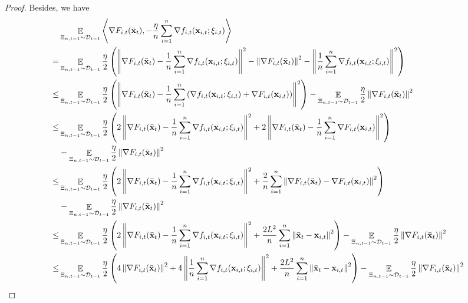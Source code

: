 \documentclass{article}
\begin{document}
\begin{proof}
Besides, we have
\begin{align}
\nonumber
& \EE_{ \Xi_{n,t-1} \sim \Dcal_{t-1} } \lrangle{\nabla F_{i,t}(\bar{\x}_t), -\frac{\eta}{n}\sum_{i=1}^n \nabla f_{i,t}(\x_{i,t};\xi_{i,t})} \\ \nonumber
= & \EE_{ \Xi_{n,t-1} \sim \Dcal_{t-1} } \frac{\eta}{2}\lrincir{ \lrnorm{\nabla F_{i,t}(\bar{\x}_t) -\frac{1}{n}\sum_{i=1}^n \nabla f_{i,t}(\x_{i,t};\xi_{i,t})}^2 - \lrnorm{\nabla F_{i,t}(\bar{\x}_t)}^2 - \lrnorm{\frac{1}{n}\sum_{i=1}^n \nabla f_{i,t}(\x_{i,t};\xi_{i,t})}^2 } \\ \nonumber
\le & \EE_{ \Xi_{n,t-1} \sim \Dcal_{t-1} } \frac{\eta}{2}\lrincir{ \lrnorm{\nabla F_{i,t}(\bar{\x}_t) -\frac{1}{n}\sum_{i=1}^n \lrincir{  \nabla  f_{i,t}(\x_{i,t};\xi_{i,t}) +   \nabla F_{i,t}(\x_{i,t}) } }^2 }  - \EE_{ \Xi_{n,t-1} \sim \Dcal_{t-1} } \frac{\eta}{2} \lrnorm{\nabla F_{i,t}(\bar{\x}_t)}^2  \\ \nonumber
\le & \EE_{ \Xi_{n,t-1} \sim \Dcal_{t-1} } \frac{\eta}{2}\lrincir{ 2 \lrnorm{\nabla F_{i,t}(\bar{\x}_t) -\frac{1}{n}\sum_{i=1}^n \nabla  f_{i,t}(\x_{i,t};\xi_{i,t})}^2 + 2 \lrnorm{ \nabla F_{i,t}(\bar{\x}_t) - \frac{1}{n}\sum_{i=1}^n\nabla F_{i,t}(\x_{i,t}) }^2 } \\ \nonumber 
& - \EE_{ \Xi_{n,t-1} \sim \Dcal_{t-1} } \frac{\eta}{2} \lrnorm{\nabla F_{i,t}(\bar{\x}_t)}^2  \\ \nonumber
\le & \EE_{ \Xi_{n,t-1} \sim \Dcal_{t-1} } \frac{\eta}{2}\lrincir{ 2 \lrnorm{\nabla F_{i,t}(\bar{\x}_t) -\frac{1}{n}\sum_{i=1}^n \nabla  f_{i,t}(\x_{i,t};\xi_{i,t})}^2 + \frac{2}{n}\sum_{i=1}^n \lrnorm{ \nabla F_{i,t}(\bar{\x}_t) - \nabla F_{i,t}(\x_{i,t}) }^2 } \\ \nonumber 
& - \EE_{ \Xi_{n,t-1} \sim \Dcal_{t-1} } \frac{\eta}{2} \lrnorm{\nabla F_{i,t}(\bar{\x}_t)}^2  \\ \nonumber
\le & \EE_{ \Xi_{n,t-1} \sim \Dcal_{t-1} } \frac{\eta}{2}\lrincir{ 2 \lrnorm{\nabla F_{i,t}(\bar{\x}_t) -\frac{1}{n}\sum_{i=1}^n \nabla  f_{i,t}(\x_{i,t};\xi_{i,t})}^2 + \frac{2L^2}{n}\sum_{i=1}^n \lrnorm{ \bar{\x}_t - \x_{i,t} }^2 }  - \EE_{ \Xi_{n,t-1} \sim \Dcal_{t-1} } \frac{\eta}{2} \lrnorm{\nabla F_{i,t}(\bar{\x}_t)}^2  \\ \nonumber
\le & \EE_{ \Xi_{n,t-1} \sim \Dcal_{t-1} } \frac{\eta}{2}\lrincir{ 4 \lrnorm{\nabla F_{i,t}(\bar{\x}_t)}^2  + 4 \lrnorm{\frac{1}{n}\sum_{i=1}^n \nabla  f_{i,t}(\x_{i,t};\xi_{i,t})}^2 + \frac{2L^2}{n}\sum_{i=1}^n \lrnorm{ \bar{\x}_t - \x_{i,t} }^2 }  - \EE_{ \Xi_{n,t-1} \sim \Dcal_{t-1} } \frac{\eta}{2} \lrnorm{\nabla F_{i,t}(\bar{\x}_t)}^2 \\ \label{equa_Lemma_gradient_norm_temp1}

\end{align}
\end{proof}
\end{document}
